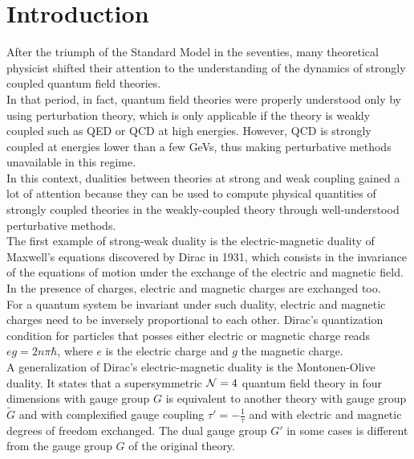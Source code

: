 \cleardoublepage
\chapter{ \bfseries Introduction}
After the triumph of the Standard Model in the seventies, many theoretical physicist shifted their attention to the understanding of the dynamics of strongly coupled quantum field theories. \\
In that period, in fact, quantum field theories were properly understood only by using perturbation theory, which is only applicable if the theory is weakly coupled such as QED or QCD at high energies.
However, QCD is strongly coupled at energies lower than a few GeVs, thus making perturbative methods unavailable in this regime.
\\
In this context, dualities between theories at strong and weak coupling gained a lot of attention because they can be used to compute physical quantities of strongly coupled theories in the weakly-coupled theory through well-understood perturbative methods.
\\

The first example of strong-weak duality is the electric-magnetic duality of Maxwell's equations discovered by Dirac in 1931, which consists in the invariance of the equations of motion under the exchange of the electric and magnetic field. 
In the presence of charges, electric and magnetic charges are exchanged too. \\
For a quantum system be invariant under such duality, electric and magnetic charges need to be inversely proportional to each other. 
Dirac's quantization condition for particles that posses either electric or magnetic charge reads $e g =  2 n \pi \hbar$, where $e$ is the electric charge and $g$ the magnetic charge.
\\

A generalization of Dirac's electric-magnetic duality is the Montonen-Olive duality.
It states that a supersymmetric  $\mathcal{N}=4$ quantum field theory in four dimensions with gauge group $G$ is equivalent to another theory with gauge group $\tilde{G}$ and with complexified gauge coupling $\tau' = - \frac{1}{\tau}$ and with electric and magnetic degrees of freedom exchanged.
The dual gauge group $G'$ in some cases is different from the gauge group $G$ of the original theory.
\\

